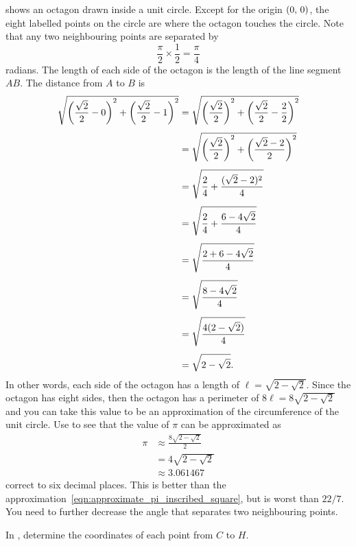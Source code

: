 \documentclass[a4paper,oneside,12pt]{article}
\begin{document}
 shows an octagon drawn inside a
unit circle.  Except for the origin $\tuple{0}{0}$, the eight labelled
points on the circle are where the octagon touches the circle.  Note
that any two neighbouring points are separated by
\[
\frac{\pi}{2} \times \frac{1}{2}
=
\frac{\pi}{4}
\]
radians.  The length of each side of the octagon is the length of the
line segment $AB$.  The distance from $A$ to $B$ is
\begin{align*}
\sqrt{
  \parenthesis*{\frac{\sqrt{2}}{2} - 0}^2
  +
  \parenthesis*{\frac{\sqrt{2}}{2} - 1}^2
}
&=
\sqrt{
  \parenthesis*{\frac{\sqrt{2}}{2}}^2
  +
  \parenthesis*{\frac{\sqrt{2}}{2} - \frac{2}{2}}^2
} \\[4pt]
&=
\sqrt{
  \parenthesis*{\frac{\sqrt{2}}{2}}^2
  +
  \parenthesis*{\frac{\sqrt{2} - 2}{2}}^2
} \\[4pt]
&=
\sqrt{
  \frac{2}{4}
  +
  \frac{(\sqrt{2} - 2)^2}{4}
} \\[4pt]
&=
\sqrt{
  \frac{2}{4}
  +
  \frac{6 - 4\sqrt{2}}{4}
} \\[4pt]
&=
\sqrt{
  \frac{
    2 + 6 - 4\sqrt{2}
  }{
    4
  }
} \\[4pt]
&=
\sqrt{
  \frac{
    8 - 4\sqrt{2}
  }{
    4
  }
} \\[4pt]
&=
\sqrt{
  \frac{
    4(2 - \sqrt{2})
  }{
    4
  }
} \\[4pt]
&=
\sqrt{
  2 - \sqrt{2}
}.
\end{align*}
In other words, each side of the octagon has a length of
$\ell = \sqrt{2 - \sqrt{2}}$.  Since the octagon has eight sides, then
the octagon has a perimeter of $8\ell = 8\sqrt{2 - \sqrt{2}}$ and you
can take this value to be an approximation of the circumference of the
unit circle.  Use  to see
that the value of $\pi$ can be approximated as
\begin{align*}
\pi
&\approx
\frac{
  8\sqrt{2 - \sqrt{2}}
}{
  2
} \\[4pt]
&=
4\sqrt{2 - \sqrt{2}} \\[4pt]
&\approx
3.061467
\end{align*}
correct to six decimal places.  This is better than the
approximation~\eqref{eqn:approximate_pi_inscribed_square}, but is
worst than $22 / 7$.  You need to further decrease the angle that
separates two neighbouring points.

\begin{exercise}
In , determine the coordinates of
each point from $C$ to $H$.
\end{exercise}
\end{document}
